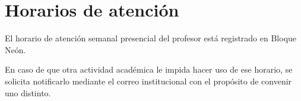 \section{Horarios de atención}
El horario de atención semanal presencial del profesor está registrado en Bloque Neón.

En caso de que otra actividad académica le impida hacer uso de ese horario, se solicita notificarlo mediante el correo institucional con el propósito de convenir uno distinto.
